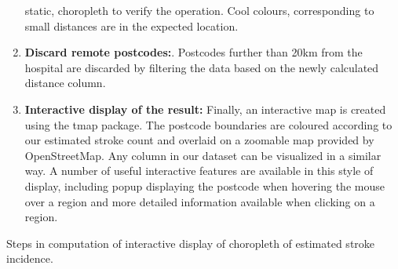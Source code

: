 \documentclass[utf8]{frontiersHLTH}
\begin{document}
\begin{table}[h]
\begin{center}
\begin{enumerate}
  static, choropleth to verify the operation. Cool colours,
  corresponding to small distances are in the expected location.
\item
  {\bf Discard remote postcodes:}. Postcodes further than 20km from the
  hospital are discarded by filtering the data based on the newly
  calculated distance column.
\item
  {\bf Interactive display of the result:} Finally, an interactive map is
  created using the tmap package. The postcode boundaries are coloured
  according to our estimated stroke count and overlaid on a zoomable map
  provided by OpenStreetMap. Any column in our dataset can be visualized
  in a similar way. A number of useful interactive features are
  available in this style of display, including popup displaying the
  postcode when hovering the mouse over a region and more detailed
  information available when clicking on a region.
\end{enumerate}
\end{center}
\caption{Steps in computation of interactive display of choropleth of
  estimated stroke incidence. \label{tab:exampleA}}
\end{table}
\end{document}
